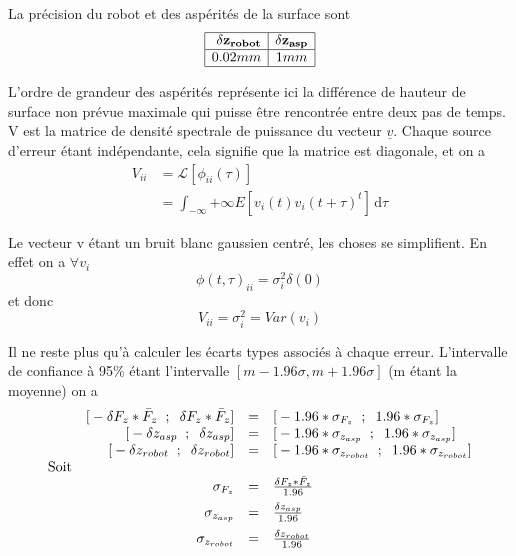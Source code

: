 \documentclass[12pt,twoside,a4paper]{article}
\newcommand\ul[1]{\underline{#1}}
\begin{document}
La précision du robot et des aspérités de la surface sont 
$$
\begin{array}{|c|c|}
\hline 
\bold{\delta z_{robot}} & \bold{\delta z_{asp}} \\
\hline 
0.02mm & 1mm \\
\hline
\end{array}
$$

L'ordre de grandeur des aspérités représente ici la différence de hauteur de surface non prévue maximale qui puisse être rencontrée entre deux pas de temps.\\

\vspace{1cm}
V est la matrice de densité spectrale de puissance du vecteur $\ul{v}$. Chaque source d'erreur étant indépendante, cela signifie que la matrice est diagonale, et on a 
$$ 
\begin{array}{ll}
V_{ii} &= \mathcal{L}[\phi_{ii}(\tau)] \\
&= \int_{-\infty}{+\infty} E[v_{i}(t)v_{i}(t+\tau)^{t}] \, \mathrm{d}\tau
\end{array}
$$

Le vecteur v étant un bruit blanc gaussien centré, les choses se simplifient. En effet on a $\forall v_{i}$
$$\phi(t,\tau)_{ii} = \sigma_{i}^{2}\delta(0)$$ et donc
$$V_{ii} = \sigma_{i}^{2} = Var(v_{i})$$

Il ne reste plus qu'à calculer les écarts types associés à chaque erreur. L'intervalle de confiance à 95\% étant l'intervalle $[m-1.96\sigma, m+1.96\sigma]$ (m étant la moyenne) on a 
$$
\begin{array}{lrcl}
	&\text{[}-\delta F_{z}*\bar{F}_{z} \rule{2mm}{0mm} ; \rule{2mm}{0mm} \delta F_{z}*\bar{F}_{z} \text{]} &=& \text{[} -1.96*\sigma_{F_{z}} \rule{2mm}{0pt}; \rule{2mm}{0pt}1.96*\sigma_{F_{z}}  \text{]} \\
	&\text{[} -\delta z_{asp} \rule{2mm}{0pt}; \rule{2mm}{0pt} \delta z_{asp} \text{]} &=& \text{[}-1.96*\sigma_{z_{asp}} \rule{2mm}{0pt}; \rule{2mm}{0pt}1.96*\sigma_{z_{asp}}  \text{]} \\
	&\text{[} -\delta z_{robot} \rule{2mm}{0pt}; \rule{2mm}{0pt} \delta z_{robot} \text{]} &=& \text{[}-1.96*\sigma_{z_{robot}} \rule{2mm}{0pt}; \rule{2mm}{0pt}1.96*\sigma_{z_{robot}}  \text{]} \\
	\text{Soit} & & & \\
	& \sigma_{F_{z}} &=&  \frac{\delta F_{z}*\bar{F}_{z}}{1.96} \\
	& \sigma_{z_{asp}} &= & \frac{\delta z_{asp}}{1.96}  \rule{0pt}{15pt}\\
	&\sigma_{z_{robot}} &= & \frac{\delta z_{robot}}{1.96}  \rule{0pt}{15pt}\\
\end{array}
$$
\end{document}
